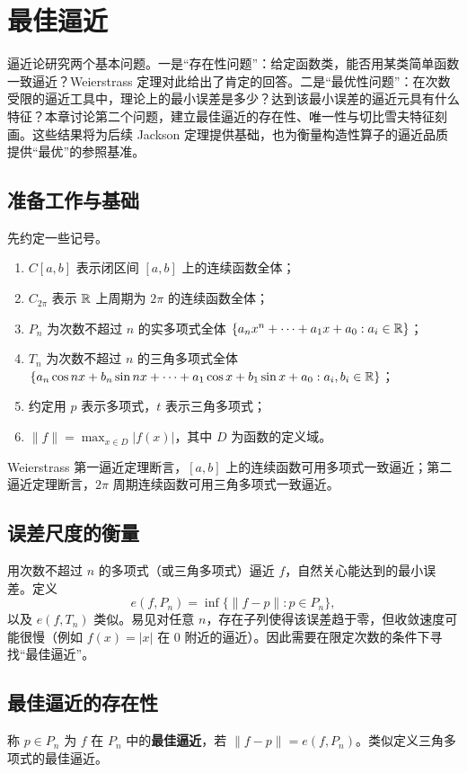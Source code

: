 \section{最佳逼近}

逼近论研究两个基本问题。一是“存在性问题”：给定函数类，能否用某类简单函数一致逼近？Weierstrass 定理对此给出了肯定的回答。二是“最优性问题”：在次数受限的逼近工具中，理论上的最小误差是多少？达到该最小误差的逼近元具有什么特征？本章讨论第二个问题，建立最佳逼近的存在性、唯一性与切比雪夫特征刻画。这些结果将为后续 Jackson 定理提供基础，也为衡量构造性算子的逼近品质提供“最优”的参照基准。

\subsection{准备工作与基础}
先约定一些记号。
\begin{definition}
\begin{enumerate}
    \item $C[a,b]$ 表示闭区间 $[a,b]$ 上的连续函数全体；
    \item $C_{2\pi}$ 表示 $\mathbb{R}$ 上周期为 $2\pi$ 的连续函数全体；
    \item $P_n$ 为次数不超过 $n$ 的实多项式全体
    $\{a_nx^n+\cdots+a_1x+a_0: a_i\in\mathbb{R}\}$；
    \item $T_n$ 为次数不超过 $n$ 的三角多项式全体
    $\{a_n\cos nx+b_n\sin nx+\cdots +a_1\cos x+b_1\sin x +a_0: a_i,b_i\in\mathbb{R}\}$；
    \item 约定用 $p$ 表示多项式，$t$ 表示三角多项式；
    \item $\|f\| = \max_{x\in D} |f(x)|$，其中 $D$ 为函数的定义域。
\end{enumerate}
\end{definition}

Weierstrass 第一逼近定理断言，$[a,b]$ 上的连续函数可用多项式一致逼近；第二逼近定理断言，$2\pi$ 周期连续函数可用三角多项式一致逼近。

\subsection{误差尺度的衡量}
用次数不超过 $n$ 的多项式（或三角多项式）逼近 $f$，自然关心能达到的最小误差。定义
\[
e(f,P_n) = \inf\{\|f-p\| : p\in P_n\},
\]
以及 $e(f,T_n)$ 类似。易见对任意 $n$，存在子列使得该误差趋于零，但收敛速度可能很慢（例如 $f(x)=|x|$ 在 $0$ 附近的逼近）。因此需要在限定次数的条件下寻找“最佳逼近”。

\subsection{最佳逼近的存在性}
\begin{definition}
称 $p\in P_n$ 为 $f$ 在 $P_n$ 中的\textbf{最佳逼近}，若 $\|f-p\| = e(f,P_n)$。类似定义三角多项式的最佳逼近。
\end{definition}

